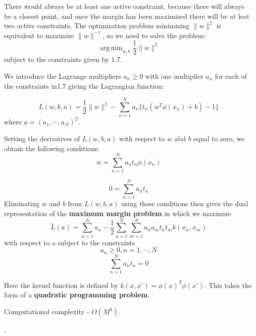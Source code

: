 \documentclass[twoside]{article}
\DeclareMathOperator*{\argmin}{arg\,min}
\begin{document}
There would always be at least one active constraint, because there will always be a closest point, and once the margin has been maximized there will be at leat two active constraints.  The optimization problem minimizing $\lVert w \rVert ^2$ is equivalent to maximize $\lVert w \rVert^{-1}$, so we need to solve the problem:
\begin{equation}
\argmin_{w,b} \frac{1}{2} \lVert w \rVert ^2
\end{equation}
subject to the constraints given by 1.7.

We introduce the Lagrange multipliers $a_n \geq 0$ with one multiplier $a_n$ for each of the constraints in1.7 giving the Lagrangian function:

\begin{equation}
L(w,b,a) = \frac{1}{2} \lVert w \rVert^2 - \sum_{n=1}^{N} a_n \{t_n(w^T \phi(x_n)+b)-1\}
\end{equation}
where $a=(a_1,\cdots,a_N)^T$.

Setting the derivatives of $L(w, b, a)$ with respect to $w$ abd $b$ equal to zero, we obtain the following conditions:
\begin{equation}
w= \sum_{n=1}^{N} a_n t_n \phi(x_n)
\end{equation}

\begin{equation}
0 = \sum_{n=1}^{N}a_nt_n
\end{equation}
Eliminating $w$ and $b$ from $L(w, b, a)$ using these conditions then gives the dual representation of the \textbf{maximum margin problem} in which we maximize
\begin{equation}
\tilde{L}(a) = \sum_{n=1}^{N}a_n - \frac{1}{2}\sum_{n=1}^{N}\sum_{m=1}^{N} a_na_mt_nt_mk(x_n,x_m)
\end{equation}
with respect to a subject to the constraints
\begin{equation}
a_n \geq 0,n = 1,\cdots,N
\end{equation}
\begin{equation}
\sum_{n=1}^{N}  a_nt_n = 0
\end{equation}

Here the kernel function is defined by $k(x, x')=\phi(x)^T\phi(x')$. This takes the form of a \textbf{quadratic programming problem}.

Computational complexity - $O(M^3)$.

{\color{red}{With dual formulation, the original optimization problem involved minimizing over $M$ variables into the dual problem with $N$ variables}}.
\end{document}
